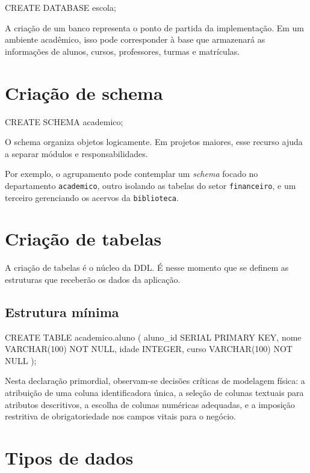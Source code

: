 \begin{sqlcode}
CREATE DATABASE escola;
\end{sqlcode}

A criação de um banco representa o ponto de partida da implementação. Em um ambiente acadêmico, isso pode corresponder à base que armazenará as informações de alunos, cursos, professores, turmas e matrículas.

\section{Criação de schema}

\begin{sqlcode}
CREATE SCHEMA academico;
\end{sqlcode}

O schema organiza objetos logicamente. Em projetos maiores, esse recurso ajuda a separar módulos e responsabilidades.

Por exemplo, o agrupamento pode contemplar um \textit{schema} focado no departamento \texttt{academico}, outro isolando as tabelas do setor \texttt{financeiro}, e um terceiro gerenciando os acervos da \texttt{biblioteca}.

\section{Criação de tabelas}

A criação de tabelas é o núcleo da DDL. É nesse momento que se definem as estruturas que receberão os dados da aplicação.

\subsection{Estrutura mínima}

\begin{sqlcode}
CREATE TABLE academico.aluno (
    aluno_id SERIAL PRIMARY KEY,
    nome VARCHAR(100) NOT NULL,
    idade INTEGER,
    curso VARCHAR(100) NOT NULL
);
\end{sqlcode}

Nesta declaração primordial, observam-se decisões críticas de modelagem física: a atribuição de uma coluna identificadora única, a seleção de colunas textuais para atributos descritivos, a escolha de colunas numéricas adequadas, e a imposição restritiva de obrigatoriedade nos campos vitais para o negócio.

\section{Tipos de dados}

